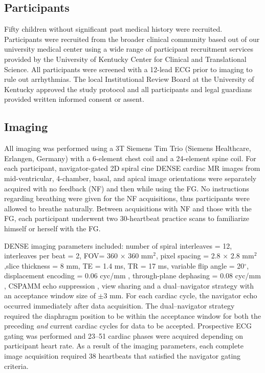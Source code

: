 \subsection{Participants}
	Fifty children without significant past medical history were recruited. Participants were recruited from the broader clinical community based out of our university medical center using a wide range of participant recruitment services provided by the University of Kentucky Center for Clinical and Translational Science. All participants were screened with a 12-lead ECG prior to imaging to rule out arrhythmias. The local Institutional Review Board at the University of Kentucky approved the study protocol and all participants and legal guardians provided written informed consent or assent.

\subsection{Imaging}
	All imaging was performed using a 3T Siemens Tim Trio (Siemens Healthcare, Erlangen, Germany) with a 6-element chest coil and a 24-element spine coil. For each participant, navigator-gated 2D spiral cine DENSE cardiac MR \cite{Zhong2010a,Wehner2015} images from mid-ventricular, 4-chamber, basal, and apical image orientations were separately acquired with no feedback (NF) and then while using the FG. No instructions regarding breathing were given for the NF acquisitions, thus participants were allowed to breathe naturally. Between acquisitions with NF and those with the FG, each participant underwent two 30-heartbeat practice scans to familiarize himself or herself with the FG.
	
	DENSE imaging parameters included: number of spiral interleaves = 12, interleaves per beat = 2, FOV= 360 × 360 mm$^2$, pixel spacing = 2.8 × 2.8 mm$^2$,slice thickness = 8 mm, TE = 1.4 ms, TR = 17 ms, variable flip angle = 20$^{\circ}$, displacement encoding = 0.06 cyc/mm \cite{Wehner2015a}, through-plane dephasing = 0.08 cyc/mm \cite{Zhong2006a}, CSPAMM echo suppression \cite{Kim2004}, view sharing and a dual--navigator strategy \cite{Hamlet2016a} with an acceptance window size of $\pm$3 mm. For each cardiac cycle, the navigator echo occurred immediately after data acquisition. The dual--navigator strategy required the diaphragm position to be within the acceptance window for both the preceding \textit{and} current cardiac cycles for data to be accepted. Prospective ECG gating was performed and 23--51 cardiac phases were acquired depending on participant heart rate. As a result of the imaging parameters, each complete image acquisition required 38 heartbeats that satisfied the navigator gating criteria.
	
